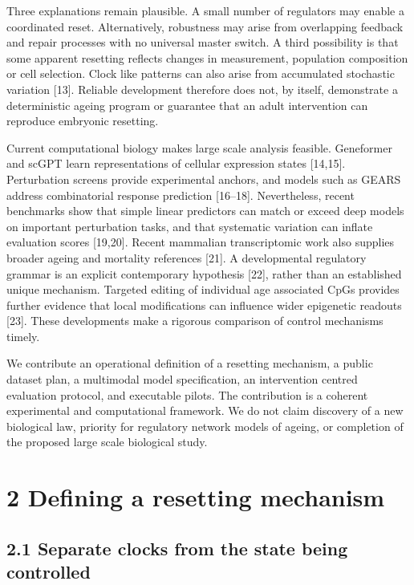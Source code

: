 \documentclass[
  11pt,
  letterpaper,
]{article}
\begin{document}
Three explanations remain plausible. A small number of regulators may
enable a coordinated reset. Alternatively, robustness may arise from
overlapping feedback and repair processes with no universal master
switch. A third possibility is that some apparent resetting reflects
changes in measurement, population composition or cell selection. Clock
like patterns can also arise from accumulated stochastic variation
{[}13{]}. Reliable development therefore does not, by itself,
demonstrate a deterministic ageing program or guarantee that an adult
intervention can reproduce embryonic resetting.

Current computational biology makes large scale analysis feasible.
Geneformer and scGPT learn representations of cellular expression states
{[}14,15{]}. Perturbation screens provide experimental anchors, and
models such as GEARS address combinatorial response prediction
{[}16--18{]}. Nevertheless, recent benchmarks show that simple linear
predictors can match or exceed deep models on important perturbation
tasks, and that systematic variation can inflate evaluation scores
{[}19,20{]}. Recent mammalian transcriptomic work also supplies broader
ageing and mortality references {[}21{]}. A developmental regulatory
grammar is an explicit contemporary hypothesis {[}22{]}, rather than an
established unique mechanism. Targeted editing of individual age
associated CpGs provides further evidence that local modifications can
influence wider epigenetic readouts {[}23{]}. These developments make a
rigorous comparison of control mechanisms timely.

We contribute an operational definition of a resetting mechanism, a
public dataset plan, a multimodal model specification, an intervention
centred evaluation protocol, and executable pilots. The contribution is
a coherent experimental and computational framework. We do not claim
discovery of a new biological law, priority for regulatory network
models of ageing, or completion of the proposed large scale biological
study.

\hypertarget{defining-a-resetting-mechanism}{%
\section{2 Defining a resetting
mechanism}\label{defining-a-resetting-mechanism}}

\hypertarget{separate-clocks-from-the-state-being-controlled}{%
\subsection{2.1 Separate clocks from the state being
controlled}\label{separate-clocks-from-the-state-being-controlled}}
\end{document}
